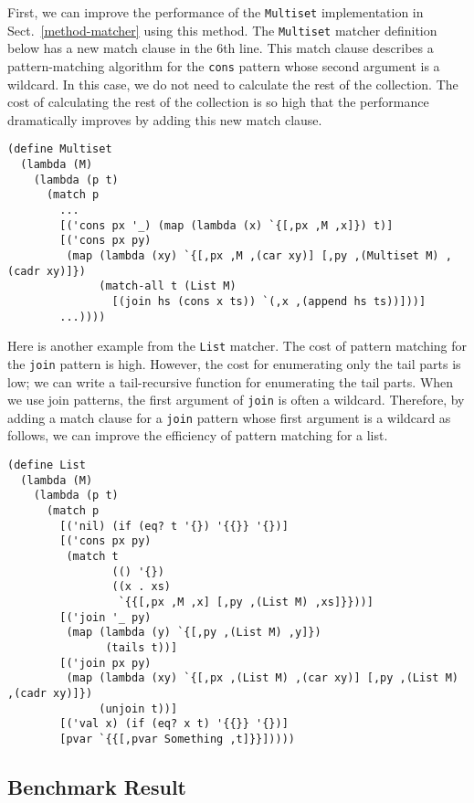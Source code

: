 \documentclass[acmlarge]{acmart}
\newcommand{\todo}[1]{\textcolor{red}{(TODO: #1)}}
\begin{document}
First, we can improve the performance of the \lstinline{Multiset} implementation in Sect.~\ref{method-matcher} using this method.
The \lstinline{Multiset} matcher definition below has a new match clause in the 6th line.
This match clause describes a pattern-matching algorithm for the \lstinline{cons} pattern whose second argument is a wildcard.
In this case, we do not need to calculate the rest of the collection.
The cost of calculating the rest of the collection is so high that the performance dramatically improves by adding this new match clause.

\begin{lstlisting}[language=egison]
(define Multiset
  (lambda (M)
    (lambda (p t)
      (match p
        ...
        [('cons px '_) (map (lambda (x) `{[,px ,M ,x]}) t)]
        [('cons px py)
         (map (lambda (xy) `{[,px ,M ,(car xy)] [,py ,(Multiset M) ,(cadr xy)]})
              (match-all t (List M)
                [(join hs (cons x ts)) `(,x ,(append hs ts))]))]
        ...))))
\end{lstlisting}

Here is another example from the \lstinline{List} matcher.
The cost of pattern matching for the \lstinline{join} pattern is high.
However, the cost for enumerating only the tail parts is low; we can write a tail-recursive function for enumerating the tail parts.
When we use join patterns, the first argument of \lstinline{join} is often a wildcard.
Therefore, by adding a match clause for a \lstinline{join} pattern whose first argument is a wildcard as follows, we can improve the efficiency of pattern matching for a list.

\begin{lstlisting}[language=egison]
(define List
  (lambda (M)
    (lambda (p t)
      (match p
        [('nil) (if (eq? t '{}) '{{}} '{})]
        [('cons px py)
         (match t
                (() '{})
                ((x . xs)
                 `{{[,px ,M ,x] [,py ,(List M) ,xs]}}))]
        [('join '_ py)
         (map (lambda (y) `{[,py ,(List M) ,y]})
               (tails t))]
        [('join px py)
         (map (lambda (xy) `{[,px ,(List M) ,(car xy)] [,py ,(List M) ,(cadr xy)]})
              (unjoin t))]
        [('val x) (if (eq? x t) '{{}} '{})]
        [pvar `{{[,pvar Something ,t]}}]))))
\end{lstlisting}

\subsection{Benchmark Result}\label{benchmark-result}
\end{document}
